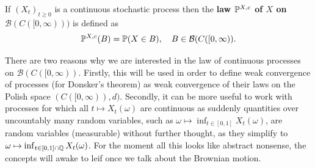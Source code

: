 \begin{ldef}
	\begin{deff}
		If $(X_t)_{t\geq 0}$ is a continuous stochastic process then the \textbf{law $\P^{X,c}$ of $X$ on $\mathcal B(C([0,\infty)))$} is defined as 
		\begin{align*}
			\P^{X,c}(B)= \P( X\in B),\quad B\in \mathcal B(C([0,\infty)).
		\end{align*}
	\end{deff}
\end{ldef}
There are two reasons why we are interested in the law of continuous processes on $\mathcal B(C([0,\infty))$. Firstly, this will be used in order to define weak convergence of processes (for Donsker's theorem) as weak convergence of their laws on the Polish space $(C([0,\infty)),d)$. Secondly, it can be more useful to work with processes for which all $t\mapsto X_t(\omega)$ are continuous as suddenly quantities over uncountably many random variables, such as $\omega\mapsto \inf_{t\in [0,1]}X_t(\omega)$, are random variables (measurable) without further thought, as they simplify to $\omega\mapsto\inf_{t\in [0,1]\cap \Q}X_t(\omega)$. For the moment all this looks like abstract nonsense, the concepts will awake to leif once we talk about the Brownian motion.\smallskip

